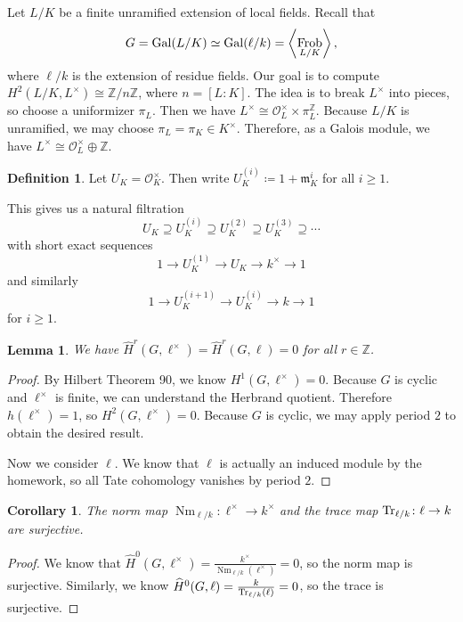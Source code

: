 \documentclass[leqno, openany]{memoir}
\newtheorem{cor}[thm]{Corollary}
\newtheorem{lem}[thm]{Lemma}
\theoremstyle{definition}
\newtheorem{defn}[thm]{Definition}
\theoremstyle{remark}
\theoremstyle{plain}
\theoremstyle{definition}
\theoremstyle{remark}
\newcommand{\Z}{\mathbb{Z}}
\newcommand{\mc}[1]{\mathcal{#1}}
\newcommand{\mf}[1]{\mathfrak{#1}}
\newcommand{\wh}[1]{\widehat{#1}}
\DeclareMathOperator{\Gal}{Gal}
\DeclareMathOperator{\Nm}{Nm}
\DeclareMathOperator{\Frob}{Frob}
\begin{document}
Let $L/K$ be a finite unramified extension of local fields. Recall that \[ G =
\Gal(L/K) \simeq \Gal(\ell / k) = \ev{\Frob_{L/K}}, \] where $\ell/k$ is the
extension of residue fields. Our goal is to compute $H^2(L/K, L^{\times}) \cong
\Z/n\Z$, where $n = [L:K]$. The idea is to break $L^{\times}$ into pieces, so
choose a uniformizer $\pi_L$. Then we have $L^{\times} \cong \mc{O}_L^{\times}
\times \pi_L^{\Z}$. Because $L/K$ is unramified, we may choose $\pi_L = \pi_K
\in K^{\times}$. Therefore, as a Galois module, we have $L^{\times} \cong
\mc{O}_L^{\times} \oplus \Z$.

\begin{defn} Let $U_K = \mc{O}_K^{\times}$. Then write $U_K^{(i)} \coloneqq 1 +
    \mf{m}_K^i$ for all $i \geq 1$.  \end{defn} This gives us a natural
    filtration \[ U_K \supseteq U_K^{(i)} \supseteq U_K^{(2)} \supseteq
    U_K^{(3)} \supseteq \cdots \] with short exact sequences \[ 1 \to U_K^{(1)}
    \to U_K \to k^{\times} \to 1 \] and similarly \[ 1 \to U_K^{(i+1)} \to
U_K^{(i)} \to k \to 1 \] for $i \geq 1$.

\begin{lem} We have $\wh{H}^r(G, \ell^{\times}) = \wh{H}^r(G, \ell) = 0$ for
all $r \in \Z$.  \end{lem}

\begin{proof} By Hilbert Theorem 90, we know $H^1(G, \ell^{\times}) = 0$.
    Because $G$ is cyclic and $\ell^{\times}$ is finite, we can understand the
    Herbrand quotient. Therefore $h(\ell^{\times}) = 1$, so $H^2(G,
    \ell^{\times}) = 0$. Because $G$ is cyclic, we may apply period $2$ to
    obtain the desired result.

    Now we consider $\ell$. We know that $\ell$ is actually an induced module
by the homework, so all Tate cohomology vanishes by period $2$.  \end{proof}

\begin{cor} The norm map $\Nm_{\ell/k} \colon \ell^{\times} \to k^{\times}$ and
the trace map $\Tr_{\ell/k} \colon \ell \to k$ are surjective.  \end{cor}

\begin{proof} We know that $\wh{H}^0(G, \ell^{\times}) =
    \frac{k^{\times}}{\Nm_{\ell/k}(\ell^{\times})} = 0$, so the norm map is
    surjective. Similarly, we know $\wh{H}^0(G, \ell) =
    \frac{k}{\Tr_{\ell/k}(\ell)} = 0$, so the trace is surjective.  \end{proof}
\end{document}
